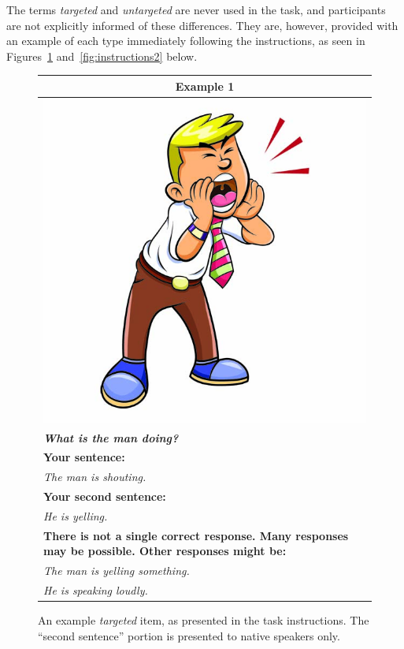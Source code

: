 \documentclass[12pt,notitlepage]{article}
\begin{document}
The terms \textit{targeted} and \textit{untargeted} are never used in the task, and participants are not explicitly informed of these differences. They are, however, provided with an example of each type immediately following the instructions, as seen in Figures~\ref{fig:instructions1} and~\ref{fig:instructions2} below.

\begin{figure}[!htb]
\begin{center}
\begin{tabular}{|p{}|}
\hline
\multicolumn{1}{|c|}{\textbf{Example 1}}\\
\hline
\multicolumn{1}{|c|}{\includegraphics[width=0.4\columnwidth,trim=0 0 0 -3]{../figures/ex02.jpg}}\\
\hline
\textbf{\textit{What is the man doing?}}\\
\hline
\textbf{Your sentence:} \\
\textit{The man is shouting.}\\
\hline
\textbf{Your second sentence:} \\
\textit{He is yelling.} \\
\hline
\textbf{There is not a single correct response. Many responses may be possible. Other responses might be:} \\
\textit{The man is yelling something.} \\
\textit{He is speaking loudly.} \\
\hline
\end{tabular}
\end{center}
\caption{An example \textit{targeted} item, as presented in the task instructions. The ``second sentence'' portion is presented to native speakers only.}
\label{fig:instructions1}
\end{figure}
\end{document}
